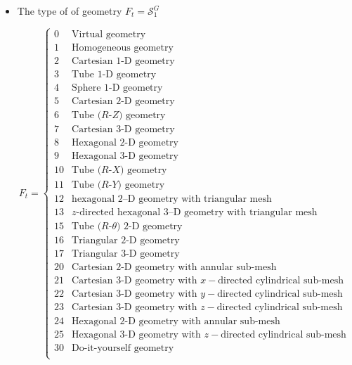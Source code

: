\begin{itemize}
\item The type of of geometry $F_{t}=\mathcal{S}^{G}_{1}$

\begin{displaymath}
F_{t} = \left\{
\begin{array}{rl}
 0 & \textrm{Virtual geometry}\\
 1 & \textrm{Homogeneous geometry} \\ 
 2 & \textrm{Cartesian 1-D geometry} \\ 
 3 & \textrm{Tube 1-D geometry}  \\
 4 & \textrm{Sphere 1-D geometry}  \\
 5 & \textrm{Cartesian 2-D geometry}  \\
 6 & \textrm{Tube ($R$-$Z$) geometry}  \\
 7 & \textrm{Cartesian 3-D geometry}  \\
 8 & \textrm{Hexagonal 2-D geometry}   \\
 9 & \textrm{Hexagonal 3-D geometry}  \\
10 & \textrm{Tube ($R$-$X$) geometry}  \\
11 & \textrm{Tube ($R$-$Y$) geometry}  \\
12 & \textrm{hexagonal 2--D geometry with triangular mesh}  \\
13 & \textrm{$z$-directed hexagonal 3--D geometry with triangular mesh}  \\
15 & \textrm{Tube ($R$-$\theta$) 2-D geometry}  \\
16 & \textrm{Triangular 2-D geometry}  \\
17 & \textrm{Triangular 3-D geometry}  \\
20 & \textrm{Cartesian 2-D geometry with annular sub-mesh}  \\
21 & \textrm{Cartesian 3-D geometry with $x-$directed cylindrical sub-mesh}  \\
22 & \textrm{Cartesian 3-D geometry with $y-$directed cylindrical sub-mesh}  \\
23 & \textrm{Cartesian 3-D geometry with $z-$directed cylindrical sub-mesh}  \\
24 & \textrm{Hexagonal 2-D geometry with annular sub-mesh}  \\
25 & \textrm{Hexagonal 3-D geometry with $z-$directed cylindrical sub-mesh }  \\
30 & \textrm{Do-it-yourself geometry}  \\
\end{array} \right.
\end{displaymath}
\eject


\end{itemize}
